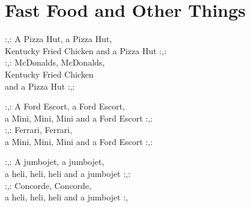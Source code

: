 \section{Fast Food and Other Things}

:,: A Pizza Hut, a Pizza Hut,\\
Kentucky Fried Chicken and a Pizza Hut :,:\\
:,: McDonalds, McDonalds,\\
Kentucky Fried Chicken\\
and a Pizza Hut :,:

:,: A Ford Escort, a Ford Escort,\\
a Mini, Mini, Mini and a Ford Escort :,:\\
:,: Ferrari, Ferrari,\\
a Mini, Mini, Mini and a Ford Escort :,:

:,: A jumbojet, a jumbojet,\\
a heli, heli, heli and a jumbojet :,:\\
:,: Concorde, Concorde,\\
a heli, heli, heli and a jumbojet :,